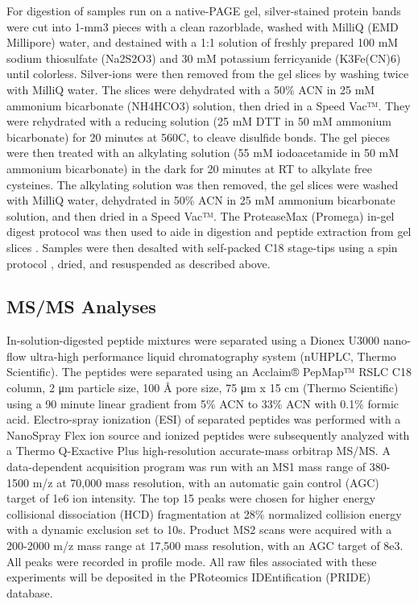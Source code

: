 For digestion of samples run on a native-PAGE gel, silver-stained protein bands were cut into 1-mm3 pieces with a clean razorblade, washed with MilliQ (EMD Millipore) water, and destained with a 1:1 solution of freshly prepared 100 mM sodium thiosulfate (Na2S2O3) and 30 mM potassium ferricyanide (K3Fe(CN)6) until colorless. Silver-ions were then removed from the gel slices by washing twice with MilliQ water. The slices were dehydrated with a 50\% ACN in 25 mM ammonium bicarbonate (NH4HCO3) solution, then dried in a Speed Vac™. They were rehydrated with a reducing solution (25 mM DTT in 50 mM ammonium bicarbonate) for 20 minutes at 560C, to cleave disulfide bonds. The gel pieces were then treated with an alkylating solution (55 mM iodoacetamide in 50 mM ammonium bicarbonate) in the dark for 20 minutes at RT to alkylate free cysteines. The alkylating solution was then removed, the gel slices were washed with MilliQ water, dehydrated in 50\% ACN in 25 mM ammonium bicarbonate solution, and then dried in a Speed Vac™. The ProteaseMax (Promega) in-gel digest protocol was then used to aide in digestion and peptide extraction from gel slices \citep{saveliev13}. Samples were then desalted with self-packed C18 stage-tips \citep{rappsilber03} using a spin protocol \citep{yu14} , dried, and resuspended as described above.

\subsection{MS/MS Analyses}
In-solution-digested peptide mixtures were separated using a Dionex U3000 nano-flow ultra-high performance liquid chromatography system (nUHPLC, Thermo Scientific). The peptides were separated using an Acclaim® PepMap™ RSLC C18 column, 2 μm particle size, 100 Å pore size, 75 μm x 15 cm (Thermo Scientific) using a 90 minute linear gradient from 5\% ACN to 33\% ACN with 0.1\% formic acid. Electro-spray ionization (ESI) of separated peptides was performed with a NanoSpray Flex ion source and ionized peptides were subsequently analyzed with a Thermo Q-Exactive Plus high-resolution accurate-mass orbitrap MS/MS. A data-dependent acquisition program was run with an MS1 mass range of 380-1500 m/z at 70,000 mass resolution, with an automatic gain control (AGC) target of 1e6 ion intensity. The top 15 peaks were chosen for higher energy collisional dissociation (HCD) fragmentation at 28\% normalized collision energy with a dynamic exclusion set to 10s. Product MS2 scans were acquired with a 200-2000 m/z mass range at 17,500 mass resolution, with an AGC target of 8e3. All peaks were recorded in profile mode. All raw files associated with these experiments will be deposited in the PRoteomics IDEntification (PRIDE) database.

